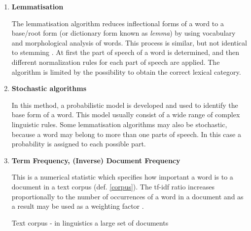 \begin{enumerate}
\begin{enumerate}
		
	\end{enumerate}
	
\item	 \textbf{Lemmatisation}
	 
	 The lemmatisation algorithm reduces inflectional forms of a word to a base/root form (or dictionary form known as \textit{lemma}) by using vocabulary and morphological analysis of words. This process is similar, but not identical to stemming \cite{lemma}. 
	 At first the part of speech of a word is determined, and then different normalization rules for each part of speech are applied. The algorithm is limited by the possibility to obtain the correct lexical category.
	 
\item	\textbf{Stochastic algorithms} 
	
	In this method, a probabilistic model is developed and used to identify the base form of a word. This model usually consist of a wide range of complex linguistic rules. Some lemmatisation algorithms may also be stochastic, because a word may belong to more than one parts of speech. In this case a probability is assigned to each possible part. 
	
\item	\textbf{Term Frequency, (Inverse) Document Frequency}

This is a numerical statistic which specifies how important a word is to a document in a text corpus (def. \ref{corpus}). The tf-idf ratio increases proportionally to the number of occurrences of a word in a document and as a result may be used as a weighting factor \cite{term-frequency}.

	 \begin{definition}
	 	\label{corpus}
	 	Text corpus - in linguistics a large set of documents 
	 	
	 \end{definition}
\end{enumerate}
	
	
